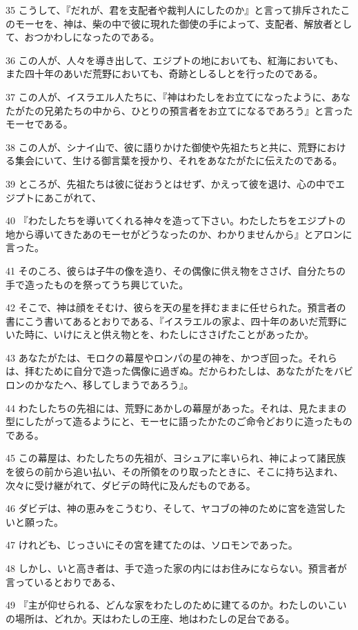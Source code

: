 \par 35 こうして、『だれが、君を支配者や裁判人にしたのか』と言って排斥されたこのモーセを、神は、柴の中で彼に現れた御使の手によって、支配者、解放者として、おつかわしになったのである。
\par 36 この人が、人々を導き出して、エジプトの地においても、紅海においても、また四十年のあいだ荒野においても、奇跡としるしとを行ったのである。
\par 37 この人が、イスラエル人たちに、『神はわたしをお立てになったように、あなたがたの兄弟たちの中から、ひとりの預言者をお立てになるであろう』と言ったモーセである。
\par 38 この人が、シナイ山で、彼に語りかけた御使や先祖たちと共に、荒野における集会にいて、生ける御言葉を授かり、それをあなたがたに伝えたのである。
\par 39 ところが、先祖たちは彼に従おうとはせず、かえって彼を退け、心の中でエジプトにあこがれて、
\par 40 『わたしたちを導いてくれる神々を造って下さい。わたしたちをエジプトの地から導いてきたあのモーセがどうなったのか、わかりませんから』とアロンに言った。
\par 41 そのころ、彼らは子牛の像を造り、その偶像に供え物をささげ、自分たちの手で造ったものを祭ってうち興じていた。
\par 42 そこで、神は顔をそむけ、彼らを天の星を拝むままに任せられた。預言者の書にこう書いてあるとおりである、『イスラエルの家よ、四十年のあいだ荒野にいた時に、いけにえと供え物とを、わたしにささげたことがあったか。
\par 43 あなたがたは、モロクの幕屋やロンパの星の神を、かつぎ回った。それらは、拝むために自分で造った偶像に過ぎぬ。だからわたしは、あなたがたをバビロンのかなたへ、移してしまうであろう』。
\par 44 わたしたちの先祖には、荒野にあかしの幕屋があった。それは、見たままの型にしたがって造るようにと、モーセに語ったかたのご命令どおりに造ったものである。
\par 45 この幕屋は、わたしたちの先祖が、ヨシュアに率いられ、神によって諸民族を彼らの前から追い払い、その所領をのり取ったときに、そこに持ち込まれ、次々に受け継がれて、ダビデの時代に及んだものである。
\par 46 ダビデは、神の恵みをこうむり、そして、ヤコブの神のために宮を造営したいと願った。
\par 47 けれども、じっさいにその宮を建てたのは、ソロモンであった。
\par 48 しかし、いと高き者は、手で造った家の内にはお住みにならない。預言者が言っているとおりである、
\par 49 『主が仰せられる、どんな家をわたしのために建てるのか。わたしのいこいの場所は、どれか。天はわたしの王座、地はわたしの足台である。
